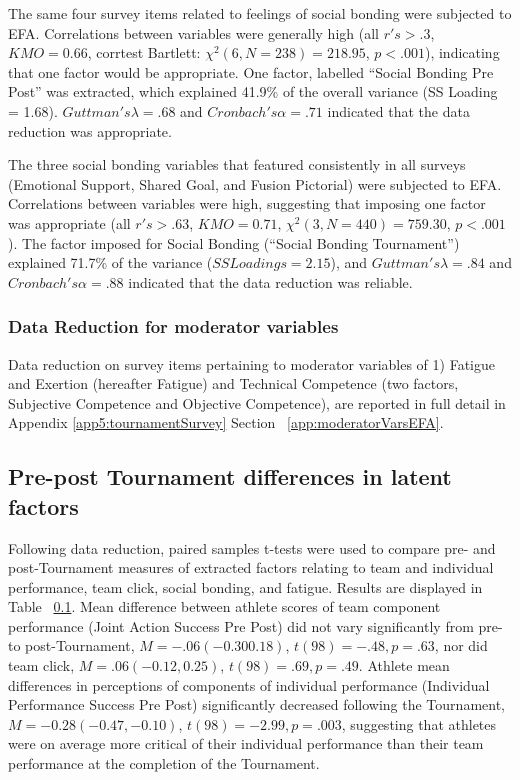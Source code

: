 The same four survey items related to feelings of social bonding were subjected to EFA. Correlations between variables were generally high (all $r's > .3$, $KMO = 0.66$, corrtest Bartlett: $\chi^2(6, N = 238) = 218.95$, $p < .001$), indicating that one factor would be appropriate.  One factor, labelled ``Social Bonding Pre Post'' was extracted, which explained 41.9\% of the overall variance (SS Loading = 1.68).  $Guttman's \lambda =.68$ and $Cronbach's \alpha = .71$ indicated that the data reduction was appropriate.

The three social bonding variables that featured consistently in all surveys (Emotional Support, Shared Goal, and Fusion Pictorial) were subjected to EFA. Correlations between variables were high, suggesting that imposing one factor was appropriate (all $r's > .63$, $KMO = 0.71$, $\chi^2(3, N = 440) =  759.30$, $p < .001$).  The factor imposed for Social Bonding (``Social Bonding Tournament'') explained 71.7\% of the variance ($SS Loadings =  2.15$), and $Guttman's \lambda =.84$ and $Cronbach's \alpha= .88$ indicated that the data reduction was reliable.

\subsubsection{Data Reduction for moderator variables}
Data reduction on survey items pertaining to moderator variables of 1) Fatigue and Exertion (hereafter Fatigue) and Technical Competence (two factors, Subjective Competence and Objective Competence), are reported in full detail in Appendix \ref{app5:tournamentSurvey} Section ~\ref{app:moderatorVarsEFA}.



 \subsection{Pre-post Tournament differences in latent factors}
 Following data reduction, paired samples t-tests were used to compare pre- and post-Tournament measures of extracted factors relating to team and individual performance, team click, social bonding, and fatigue. Results are displayed in Table ~\ref{}.  Mean difference between athlete scores of team component performance (Joint Action Success Pre Post) did not vary significantly from pre- to post-Tournament, $M = -.06 (-0.30  0.18)$, $t(98)= -.48, p = .63$, nor did team click, $M = .06 (-0.12, 0.25)$, $t(98)= .69, p = .49$. Athlete mean differences in perceptions of components of individual performance (Individual Performance Success Pre Post) significantly decreased following the Tournament, $M = -0.28 (-0.47, -0.10)$, $t(98)= -2.99, p = .003$, suggesting that athletes were on average more critical of their individual performance than their team performance at the completion of the Tournament.

